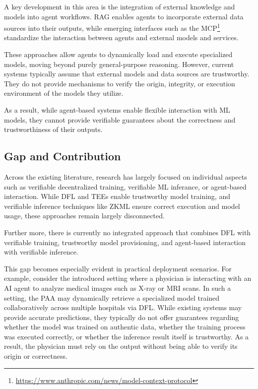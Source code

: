 A key development in this area is the integration of external knowledge and models into agent workflows. \ac{RAG} \cite{lewis2020rag} enables agents to incorporate external data sources into their outputs, while emerging interfaces such as the \ac{MCP}\footnote{\url{https://www.anthropic.com/news/model-context-protocol}} standardize the interaction between agents and external models and services.

These approaches allow agents to dynamically load and execute specialized models, moving beyond purely general-purpose reasoning. However, current systems typically assume that external models and data sources are trustworthy. They do not provide mechanisms to verify the origin, integrity, or execution environment of the models they utilize.

As a result, while agent-based systems enable flexible interaction with \ac{ML} models, they cannot provide verifiable guarantees about the correctness and trustworthiness of their outputs.

\subsection{Gap and Contribution}

Across the existing literature, research has largely focused on individual aspects such as verifiable decentralized training, verifiable \ac{ML} inferance, or agent-based interaction. While \ac{DFL} and \acp{TEE} enable trustworthy model training, and verifiable inference techniques like ZKML ensure correct execution and model usage, these approaches remain largely disconnected. 

Further more, there is currently no integrated approach that combines \ac{DFL} with verifiable training, trustworthy model provisioning, and agent-based interaction with verifiable inference.

This gap becomes especially evident in practical deployment scenarios. For example, consider the introduced setting where a physician is interacting with an \ac{AI} agent to analyze medical images such as X-ray or MRI scans. In such a setting, the \ac{PAA} may dynamically retrieve a specialized model trained collaboratively across multiple hospitals via \ac{DFL}. While existing systems may provide accurate predictions, they typically do not offer guarantees regarding whether the model was trained on authentic data, whether the training process was executed correctly, or whether the inference result itself is trustworthy. As a result, the physician must rely on the output without being able to verify its origin or correctness.

